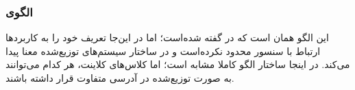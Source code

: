 \subsubsection{الگوی }
\label{distrObserverSec}
\begin{RTL}
این الگو همان  است که در
\cite{ref1} گفته شده‌است؛ اما در این‌جا تعریف خود را به کاربردها
ارتباط با سنسور محدود نکرده‌است و در ساختار سیستم‌های توزیع‌شده معنا پیدا می‌کند.
در اینجا ساختار الگو کاملا مشابه  است؛
اما کلاس‌های کلاینت، هر کدام می‌توانند به صورت توزیع‌شده در آدرسی متفاوت
قرار داشته باشند.
\end{RTL}